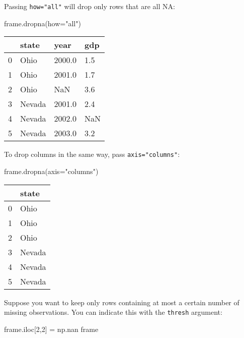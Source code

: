 \documentclass[
  letterpaper,
  DIV=11,
  numbers=noendperiod]{scrreprt}
\newenvironment{Shaded}{\begin{snugshade}}{\end{snugshade}}
\newcommand{\DecValTok}[1]{\textcolor[rgb]{0.68,0.00,0.00}{#1}}
\newcommand{\NormalTok}[1]{\textcolor[rgb]{0.00,0.23,0.31}{#1}}
\newcommand{\OperatorTok}[1]{\textcolor[rgb]{0.37,0.37,0.37}{#1}}
\newcommand{\StringTok}[1]{\textcolor[rgb]{0.13,0.47,0.30}{#1}}
\begin{document}
Passing \texttt{how="all"} will drop only rows that are all NA:

\begin{Shaded}
\begin{Highlighting}[]
\NormalTok{frame.dropna(how}\OperatorTok{=}\StringTok{"all"}\NormalTok{)}
\end{Highlighting}
\end{Shaded}

\begin{longtable}[]{@{}llll@{}}
\toprule()
& state & year & gdp \\
\midrule()
\endhead
0 & Ohio & 2000.0 & 1.5 \\
1 & Ohio & 2001.0 & 1.7 \\
2 & Ohio & NaN & 3.6 \\
3 & Nevada & 2001.0 & 2.4 \\
4 & Nevada & 2002.0 & NaN \\
5 & Nevada & 2003.0 & 3.2 \\
\bottomrule()
\end{longtable}

To drop columns in the same way, pass \texttt{axis="columns"}:

\begin{Shaded}
\begin{Highlighting}[]
\NormalTok{frame.dropna(axis}\OperatorTok{=}\StringTok{"columns"}\NormalTok{)}
\end{Highlighting}
\end{Shaded}

\begin{longtable}[]{@{}ll@{}}
\toprule()
& state \\
\midrule()
\endhead
0 & Ohio \\
1 & Ohio \\
2 & Ohio \\
3 & Nevada \\
4 & Nevada \\
5 & Nevada \\
\bottomrule()
\end{longtable}

Suppose you want to keep only rows containing at most a certain number
of missing observations. You can indicate this with the \texttt{thresh}
argument:

\begin{Shaded}
\begin{Highlighting}[]
\NormalTok{frame.iloc[}\DecValTok{2}\NormalTok{,}\DecValTok{2}\NormalTok{] }\OperatorTok{=}\NormalTok{ np.nan}
\NormalTok{frame}
\end{Highlighting}
\end{Shaded}
\end{document}
